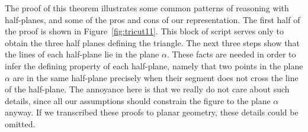 The proof of this theorem illustrates some common patterns of reasoning with half-planes, and some of the pros and cons of our representation. The first half of the proof is shown in Figure~\ref{fig:tricut11}. This block of script serves only to obtain the three half planes defining the triangle. The next three steps show that the lines of each half-plane lie in the plane $\alpha$. These facts are needed in order to infer the defining property of each half-plane, namely that two points in the plane $\alpha$ are in the same half-plane precisely when their segment does not cross the line of the half-plane. The annoyance here is that we really do not care about such details, since all our assumptions should constrain the figure to the plane $\alpha$ anyway. If we transcribed these proofs to planar geometry, these details could be omitted. 

